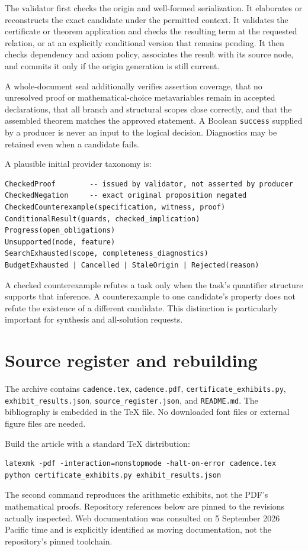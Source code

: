 \documentclass[11pt,letterpaper]{article}
\newcommand{\code}[1]{\nolinkurl{#1}}
\theoremstyle{definition}
\begin{document}
The validator first checks the origin and well-formed serialization. It elaborates
or reconstructs the exact candidate under the permitted context. It validates the
certificate or theorem application and checks the resulting term at the requested
relation, or at an explicitly conditional version that remains pending. It then
checks dependency and axiom policy, associates the result with its source node,
and commits it only if the origin generation is still current.

A whole-document seal additionally verifies assertion coverage, that no unresolved
proof or mathematical-choice metavariables remain in accepted declarations, that
all branch and structural scopes close correctly, and that the assembled theorem
matches the approved statement. A Boolean \code{success} supplied by a producer is
never an input to the logical decision. Diagnostics may be retained even when a
candidate fails.

A plausible initial provider taxonomy is:
\begin{lstlisting}
CheckedProof        -- issued by validator, not asserted by producer
CheckedNegation     -- exact original proposition negated
CheckedCounterexample(specification, witness, proof)
ConditionalResult(guards, checked_implication)
Progress(open_obligations)
Unsupported(node, feature)
SearchExhausted(scope, completeness_diagnostics)
BudgetExhausted | Cancelled | StaleOrigin | Rejected(reason)
\end{lstlisting}
A checked counterexample refutes a task only when the task's quantifier structure
supports that inference. A counterexample to one candidate's property does not
refute the existence of a different candidate. This distinction is particularly
important for synthesis and all-solution requests.

\section{Source register and rebuilding}\label{app:sources}
The archive contains \code{cadence.tex}, \code{cadence.pdf},
\code{certificate_exhibits.py}, \code{exhibit_results.json},
\code{source_register.json}, and \code{README.md}. The bibliography is embedded in
the TeX file. No downloaded font files or external figure files are needed.

Build the article with a standard TeX distribution:
\begin{lstlisting}
latexmk -pdf -interaction=nonstopmode -halt-on-error cadence.tex
python certificate_exhibits.py exhibit_results.json
\end{lstlisting}
The second command reproduces the arithmetic exhibits, not the PDF's mathematical
proofs. Repository references below are pinned to the revisions actually inspected.
Web documentation was consulted on 5 September 2026 Pacific time and is explicitly
identified as moving documentation, not the repository's pinned toolchain.
\end{document}
